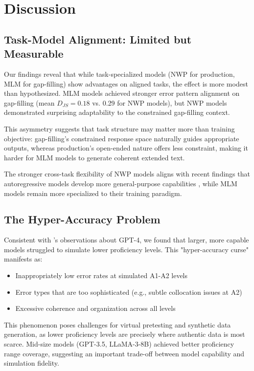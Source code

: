 \section{Discussion}

\subsection{Task-Model Alignment: Limited but Measurable}

Our findings reveal that while task-specialized models (NWP for production, MLM for gap-filling) show advantages on aligned tasks, the effect is more modest than hypothesized. MLM models achieved stronger error pattern alignment on gap-filling (mean $D_{JS} = 0.18$ vs. 0.29 for NWP models), but NWP models demonstrated surprising adaptability to the constrained gap-filling context.

This asymmetry suggests that task structure may matter more than training objective: gap-filling's constrained response space naturally guides appropriate outputs, whereas production's open-ended nature offers less constraint, making it harder for MLM models to generate coherent extended text.

The stronger cross-task flexibility of NWP models aligns with recent findings that autoregressive models develop more general-purpose capabilities \cite{bubeck2023sparks}, while MLM models remain more specialized to their training paradigm.

\subsection{The Hyper-Accuracy Problem}

Consistent with \citet{benedetto2024using}'s observations about GPT-4, we found that larger, more capable models struggled to simulate lower proficiency levels. This "hyper-accuracy curse" manifests as:

\begin{itemize}
    \item Inappropriately low error rates at simulated A1-A2 levels
    \item Error types that are too sophisticated (e.g., subtle collocation issues at A2)
    \item Excessive coherence and organization across all levels
\end{itemize}

This phenomenon poses challenges for virtual pretesting and synthetic data generation, as lower proficiency levels are precisely where authentic data is most scarce. Mid-size models (GPT-3.5, LLaMA-3-8B) achieved better proficiency range coverage, suggesting an important trade-off between model capability and simulation fidelity.

